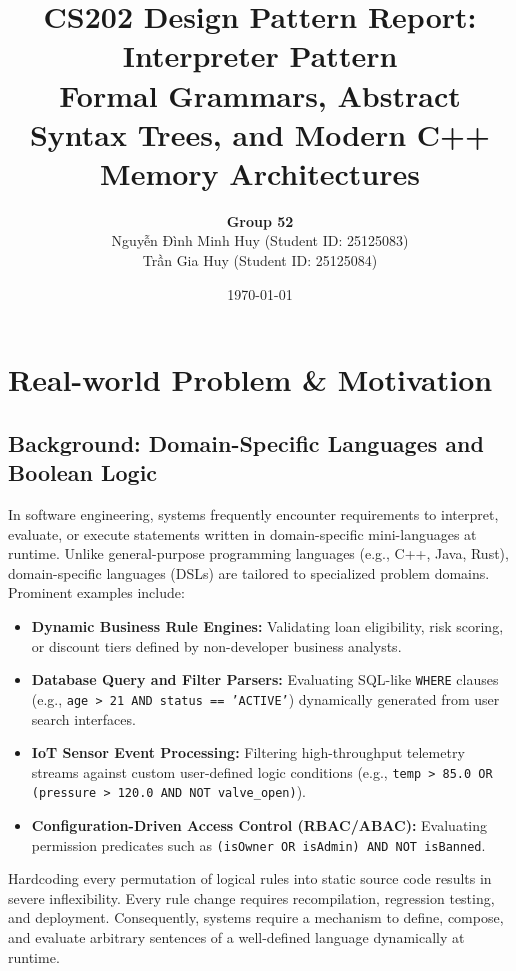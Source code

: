 \documentclass[12pt,a4paper]{article}
\title{\textbf{CS202 Design Pattern Report: Interpreter Pattern}\\\large Formal Grammars, Abstract Syntax Trees, and Modern C++ Memory Architectures}
\author{\textbf{Group 52} \\ {\fontencoding{T5}\selectfont Nguyễn Đình Minh Huy} (Student ID: 25125083) \\ {\fontencoding{T5}\selectfont Trần Gia Huy} (Student ID: 25125084)}
\date{\today}
\begin{document}
\maketitle
\tableofcontents
\newpage

\section{Real-world Problem \& Motivation}

\subsection{Background: Domain-Specific Languages and Boolean Logic}
In software engineering, systems frequently encounter requirements to interpret, evaluate, or execute statements written in domain-specific mini-languages at runtime. Unlike general-purpose programming languages (e.g., C++, Java, Rust), domain-specific languages (DSLs) are tailored to specialized problem domains. Prominent examples include:
\begin{itemize}
    \item \textbf{Dynamic Business Rule Engines:} Validating loan eligibility, risk scoring, or discount tiers defined by non-developer business analysts.
    \item \textbf{Database Query and Filter Parsers:} Evaluating SQL-like \texttt{WHERE} clauses (e.g., \texttt{age > 21 AND status == 'ACTIVE'}) dynamically generated from user search interfaces.
    \item \textbf{IoT Sensor Event Processing:} Filtering high-throughput telemetry streams against custom user-defined logic conditions (e.g., \texttt{temp > 85.0 OR (pressure > 120.0 AND NOT valve\_open)}).
    \item \textbf{Configuration-Driven Access Control (RBAC/ABAC):} Evaluating permission predicates such as \texttt{(isOwner OR isAdmin) AND NOT isBanned}.
\end{itemize}

Hardcoding every permutation of logical rules into static source code results in severe inflexibility. Every rule change requires recompilation, regression testing, and deployment. Consequently, systems require a mechanism to define, compose, and evaluate arbitrary sentences of a well-defined language dynamically at runtime.
\end{document}

